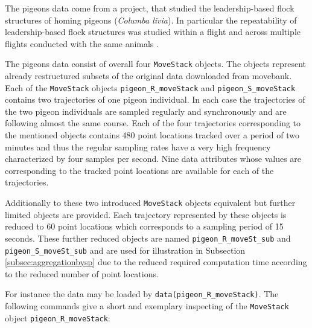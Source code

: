 \documentclass[12pt, oneside, a4paper]{scrbook}
\let\code=\texttt
\begin{document}


The pigeons data come from a project, that studied the leadership-based flock structures of homing
pigeons (\textit{Columba livia}). In particular the repeatability of leadership-based flock structures was studied within a flight and across multiple flights conducted with the same animals \citep{santos_temporal_2014}.
\par\medskip

The pigeons data consist of overall four \code{MoveStack} objects. The objects represent already restructured subsets of the original data downloaded from movebank. Each of the \code{MoveStack} objects \code{pigeon\_R\_moveStack} and \code{pigeon\_S\_moveStack} contains two trajectories of one pigeon individual. In each case the trajectories of the two pigeon individuals are sampled regularly and synchronously and are following almost the same course. Each of the four trajectories corresponding to the mentioned objects contains 480 point locations tracked over a period of two minutes and thus the regular sampling rates have a very high frequency characterized by four samples per second. Nine data attributes whose values are corresponding to the tracked point locations are available for each of the trajectories.
\par\medskip

Additionally to these two introduced \code{MoveStack} objects equivalent but further limited objects are provided. Each trajectory represented by these objects is reduced to 60 point locations which corresponds to a sampling period of 15 seconds. These further reduced objects are named \code{pigeon\_R\_moveSt\_sub} and \code{pigeon\_S\_moveSt\_sub} and are used for illustration in Subsection \ref{subsec:aggregationbysp} due to the reduced required computation time according to the reduced number of point locations.
\par\medskip

For instance the data may be loaded by \code{data(pigeon\_R\_moveStack)}. The following commands give a short and exemplary inspecting of the \code{MoveStack} object \code{pigeon\_R\_moveStack}:
\par\medskip
\end{document}
